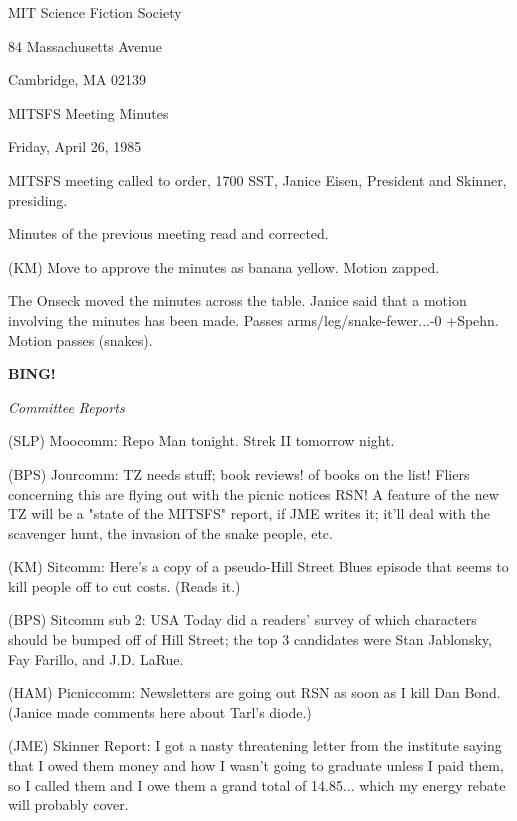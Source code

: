 \documentclass[12pt]{article}
\newcommand{\bing}{{\bf BING!} }
\newcommand{\goto}[1]{\bing \vskip 12pt \centerline{{\em{#1}}}}
\begin{document}
\begin{center}

MIT Science Fiction Society 

84 Massachusetts Avenue

Cambridge, MA 02139

\vspace{12pt}

MITSFS Meeting Minutes 

Friday, April 26, 1985

\end{center}
 
\vspace{18pt}

\setlength{\parskip}{6pt}

\noindent
MITSFS meeting called to order, 1700 SST,
Janice Eisen, President and Skinner, presiding.

Minutes of the previous meeting read and corrected.

(KM) Move to approve the minutes as banana yellow. Motion zapped.

The Onseck moved the minutes across the table. Janice said that a motion involving the minutes has been made. Passes arms/leg/snake-fewer...-0 +Spehn. Motion passes (snakes).

\goto{Committee Reports}

(SLP) Moocomm: Repo Man tonight. Strek II tomorrow night.

(BPS) Jourcomm: TZ needs stuff; book reviews! of books on the list! Fliers concerning this are flying out with the picnic notices RSN! A feature of the new TZ will be a "state of the MITSFS" report, if JME writes it; it'll deal with the scavenger hunt, the invasion of the snake people, etc.

(KM) Sitcomm: Here's a copy of a pseudo-Hill Street Blues episode that seems to kill people off to cut costs. (Reads it.)

(BPS) Sitcomm sub 2: USA Today did a readers' survey of which characters should be bumped off of Hill Street; the top 3 candidates were Stan Jablonsky, Fay Farillo, and J.D. LaRue.

(HAM) Picniccomm: Newsletters are going out RSN as soon as I kill Dan Bond. (Janice made comments here about Tarl's diode.)

(JME) Skinner Report: I got a nasty threatening letter from the institute saying that I owed them money and how I wasn't going to graduate unless I paid them, so I called them and I owe them a grand total of 14.85... which my energy rebate will probably cover.
\end{document}
